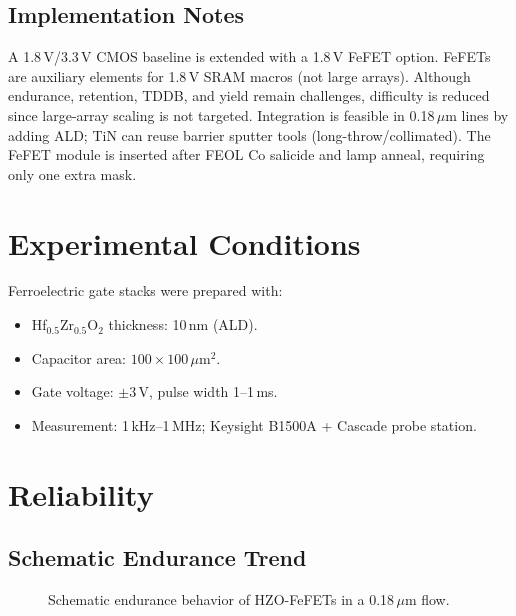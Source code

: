 \documentclass[journal]{IEEEtran}
\begin{document}
\subsection*{Implementation Notes}
A 1.8\,V/3.3\,V CMOS baseline is extended with a 1.8\,V FeFET option. FeFETs are auxiliary elements for 1.8\,V SRAM macros (not large arrays). Although endurance, retention, TDDB, and yield remain challenges, difficulty is reduced since large-array scaling is not targeted. Integration is feasible in 0.18\,$\mu$m lines by adding ALD; TiN can reuse barrier sputter tools (long-throw/collimated). The FeFET module is inserted after FEOL Co salicide and lamp anneal, requiring only one extra mask.

\section{Experimental Conditions}
Ferroelectric gate stacks were prepared with:
\begin{itemize}
  \item Hf$_{0.5}$Zr$_{0.5}$O$_2$ thickness: 10\,nm (ALD).
  \item Capacitor area: $100\times100\,\mu\text{m}^2$.
  \item Gate voltage: $\pm 3$\,V, pulse width 1–1\,ms.
  \item Measurement: 1\,kHz–1\,MHz; Keysight B1500A + Cascade probe station.
\end{itemize}

\section{Reliability}

\subsection*{Schematic Endurance Trend}
\begin{figure}[t]
\centering
{}
\caption{Schematic endurance behavior of HZO-FeFETs in a 0.18\,$\mu$m flow.}
\label{fig:endurance}
\end{figure}
\end{document}
